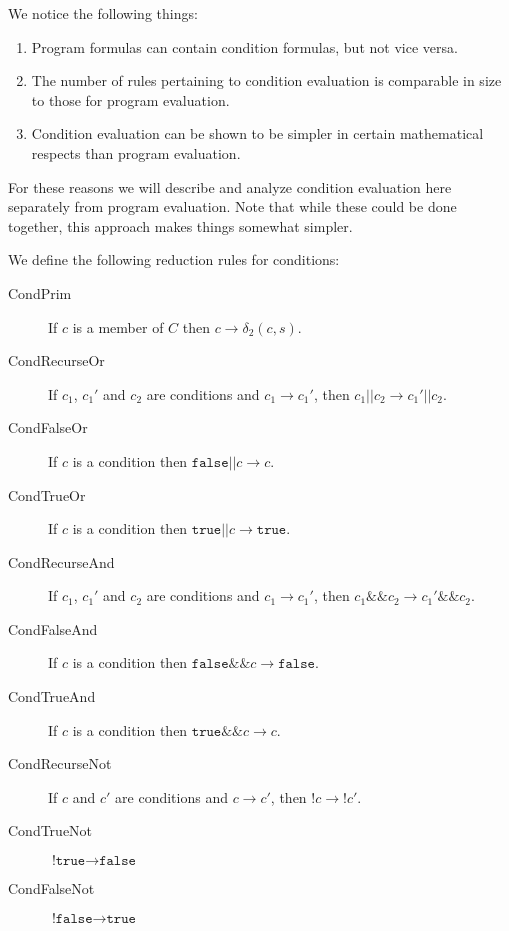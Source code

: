 \documentclass[11pt]{article}
\begin{document}
We notice the following things:
\begin{enumerate}
\item Program formulas can contain condition formulas, but not vice versa.
\item The number of rules pertaining to condition evaluation is comparable in size to those for program evaluation.
\item Condition evaluation can be shown to be simpler in certain mathematical respects than program evaluation.
\end{enumerate}

For these reasons we will describe and analyze condition evaluation here separately from program evaluation.  Note that while these could be done together, this approach makes things somewhat simpler.

We define the following reduction rules for conditions:

\begin{description}

\item[CondPrim] If $c$ is a member of $C$ then $c \rightarrow \delta_{2}(c, s)$.

\item[CondRecurseOr] If $c_{1}$, $c_{1}'$ and $c_{2}$ are conditions and $c_{1} \rightarrow c_{1}'$, then
$c_{1}\texttt{||}c_{2} \rightarrow c_{1}'\texttt{||}c_{2}$.
\item[CondFalseOr] If $c$ is a condition then $\texttt{false||} c \rightarrow c$.
\item[CondTrueOr] If $c$ is a condition then $\texttt{true||} c \rightarrow \texttt{true}$.

\item[CondRecurseAnd] If $c_{1}$, $c_{1}'$ and $c_{2}$ are conditions and $c_{1} \rightarrow c_{1}'$, then
$c_{1}\texttt{\&\&}c_{2} \rightarrow c_{1}'\texttt{\&\&}c_{2}$.
\item[CondFalseAnd] If $c$ is a condition then $\texttt{false\&\&} c \rightarrow \texttt{false}$.
\item[CondTrueAnd] If $c$ is a condition then $\texttt{true\&\&} c \rightarrow c$.

\item[CondRecurseNot] If $c$ and $c'$ are conditions and $c \rightarrow c'$, then
$\texttt{!}c \rightarrow \texttt{!}c'$.
\item[CondTrueNot] $\texttt{!true} \rightarrow \texttt{false}$
\item[CondFalseNot] $\texttt{!false} \rightarrow \texttt{true}$

\end{description}
\end{document}
